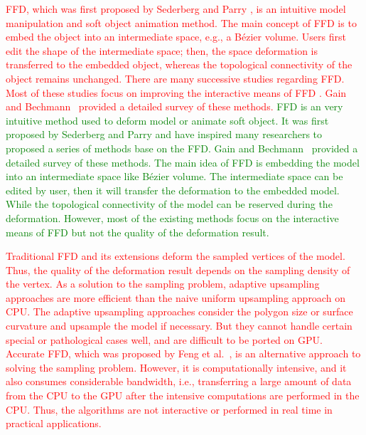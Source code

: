\documentclass[3p]{elsarticle}
\begin{document}
\textcolor{red}{FFD, which was first proposed by Sederberg and Parry \cite{Sederberg86}, is an intuitive model manipulation and soft
object animation method. The main concept of FFD is to embed the object into an intermediate space, e.g., a B\'ezier
volume. Users first edit the shape of the intermediate space; then, the space deformation is transferred to the embedded
object, whereas the topological connectivity of the object remains unchanged. There are many successive studies
regarding FFD. Most of these studies focus on improving the interactive means of FFD \cite{Coquillart90, Hui02,
MacCracken96, McDonnel07, Xu13}. Gain and Bechmann~\cite{Gain08} provided a detailed survey of these methods.}
\textcolor{green}{
    FFD is an very intuitive method used to deform model or animate soft object. It was first proposed by Sederberg and Parry \cite{Sederberg86} and have inspired many researchers to proposed a series of methods base on the FFD. Gain and Bechmann~\cite{Gain08} provided a detailed survey of these methods. The main idea of FFD is embedding the model into an intermediate space like B\'ezier volume. The intermediate space can be edited by user, then it will transfer the deformation to the embedded model. While the topological connectivity of the model can be reserved during the deformation. However, most of the existing methods focus on the interactive means of FFD but not the quality of the deformation result.
}

\textcolor{red}{Traditional FFD and its extensions deform the sampled vertices of the model. Thus, the quality of the deformation result
depends on the sampling density of the vertex. As a solution to the sampling problem, adaptive upsampling approaches
\cite{Gain99, Griessmair89, Parry86} are more efficient than the naive uniform upsampling approach on CPU. The adaptive
upsampling approaches consider the polygon size or surface curvature and upsample the model if necessary. But they
cannot handle certain special or pathological cases well, and are difficult to be ported on GPU. Accurate FFD, which
was proposed by Feng et al.~\cite{Feng98, Feng02, Feng00}, is an alternative approach to solving the sampling problem.
However, it is computationally intensive, and it also consumes considerable bandwidth, i.e., transferring a large amount
of data from the CPU to the GPU after the intensive computations are performed in the CPU. Thus, the algorithms are not
interactive or performed in real time in practical applications.}
\end{document}
